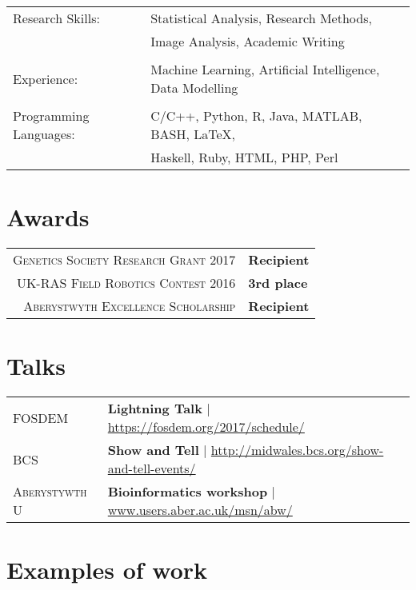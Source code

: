 \documentclass[a4paper,10pt]{article}
\begin{document}
\begin{tabular}{ll}


  Research Skills: & Statistical Analysis, Research Methods,\\& Image Analysis, Academic Writing

  \\

  \\

  Experience: & Machine Learning, Artificial Intelligence, Data Modelling

  \\

  \\


  Programming Languages: & C/C++, Python, R, Java, MATLAB, BASH, \LaTeX,\\& Haskell, Ruby, HTML, PHP, Perl


\end{tabular}


\section{Awards}
\begin{tabular}{rl}
  \textsc{Genetics Society Research Grant 2017}& \textbf{Recipient}
  \\
  \textsc{UK-RAS Field Robotics Contest 2016}& \textbf{3rd place}
  \\
  \textsc{Aberystwyth Excellence Scholarship}& \textbf{Recipient}
\end{tabular}


\section{Talks}
\begin{tabular}{ll}

  \textsc{FOSDEM} & \textbf{Lightning Talk} | \href{https://fosdem.org/2017/schedule/}{https://fosdem.org/2017/schedule/} \\
  \textsc{BCS} & \textbf{Show and Tell} | \href{http://www.midwales.bcs.org/show-and-tell-events/}{http://midwales.bcs.org/show-and-tell-events/}\\
  \textsc{Aberystywth U} & \textbf{Bioinformatics workshop} | \href{www.users.aber.ac.uk/msn/abw/index.html}{www.users.aber.ac.uk/msn/abw/}

\end{tabular}


\section{Examples of work}
\end{document}
